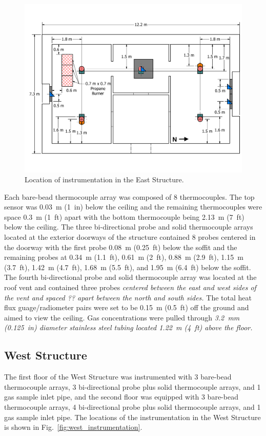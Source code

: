 \documentclass[12pt,oneside]{book}
\begin{document}
\begin{figure}[!ht]
	\includegraphics[width=\columnwidth]{../Figures/Floor_Plans/East_Structure_Dimensioned_Instrumentation}
	\caption{Location of instrumentation in the East Structure.}
	\label{fig:East_Instrumentation}
\end{figure}

Each bare-bead thermocouple array was composed of 8 thermocouples. The top sensor was 0.03~m (1~in) below the ceiling and the remaining thermocouples were space 0.3~m (1~ft) apart with the bottom thermocouple being 2.13~m (7~ft) below the ceiling. The three bi-directional probe and solid thermocouple arrays located at the exterior doorways of the structure contained 8 probes centered in the doorway with the first probe 0.08~m (0.25~ft) below the soffit and the remaining probes at 0.34~m (1.1~ft), 0.61~m (2~ft), 0.88~m (2.9~ft), 1.15~m (3.7~ft), 1.42~m (4.7~ft), 1.68~m (5.5~ft), and 1.95~m (6.4~ft) below the soffit. The fourth bi-directional probe and solid thermocouple array was located at the roof vent and contained three probes \textit{centered between the east and west sides of the vent and spaced ?? apart between the north and south sides.} The total heat flux guage/radiometer pairs were set to be 0.15~m (0.5~ft) off the ground and aimed to view the ceiling. Gas concentrations were pulled through \textit{3.2~mm (0.125~in) diameter stainless steel tubing located 1.22~m (4~ft) above the floor.}

\subsection{West Structure}
\label{sec:West_Instrumentation}
The first floor of the West Structure was instrumented with 3 bare-bead thermocouple arrays, 3 bi-directional probe plus solid thermocouple arrays, and 1 gas sample inlet pipe, and the second floor was equipped with 3 bare-bead thermocouple arrays, 4 bi-directional probe plus solid thermocouple arrays, and 1 gas sample inlet pipe. The locations of the instrumentation in the West Structure is shown in Fig.~\ref{fig:west_instrumentation}.
\end{document}
